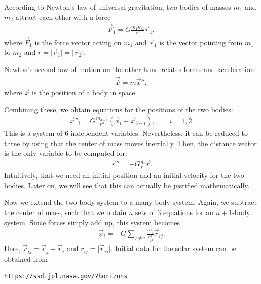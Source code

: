 \begin{example}
  According to Newton's law of universal gravitation, two bodies of
  masses $m_1$ and $m_2$ attract each other with a force
  \begin{gather*}
    \vec F_1 = G \frac{m_1m_2}{r^3} \vec r_1,
  \end{gather*}
  where $\vec F_1$ is the force vector acting on $m_1$ and $\vec r_1$
  is the vector pointing from $m_1$ to $m_2$ and $r = \lvert\vec r_1\rvert = \lvert\vec r_2\rvert$.

  Newton's second law of motion on the other hand relates forces and
  acceleration:
  \begin{gather*}
    \vec F = m \vec x'',
  \end{gather*}
  where $\vec x$ is the position of a body in space.

  Combining these, we obtain equations for the positions of the two bodies:
  \begin{gather*}
    \vec x''_i = G \frac{m_{3-i}}{r^3} (\vec x_i - \vec x_{3-i}), \qquad i=1,2.
  \end{gather*}
  This is a system of 6 independent variables. Nevertheless, it can be
  reduced to three by using that the center of mass moves
  inertially. Then, the distance vector is the only variable to be
  computed for:
  \begin{gather*}
    \vec r'' = - G \frac{m}{r^3} \vec r.
  \end{gather*}
  Intuitively, that we need an initial position and an initial
  velocity for the two bodies. Later on, we will see that this can
  actually be justified mathematically.
\end{example}

\begin{example}
  Now we extend the two-body system to a many-body system. Again, we
  subtract the center of mass, such that we obtain $n$ sets of 3
  equations for an $n+1$-body system. Since forces simply add up, this
  system becomes
  \begin{gather}
    \label{eq:celestial}
    \vec x_i = -G \sum_{j\neq i} \frac{m_j}{r_{ij}^3} \vec r_{ij}.
  \end{gather}
  Here, $\vec r_{ij} = \vec r_j - \vec r_i$ and $r_{ij} = \lvert \vec r_{ij}\rvert$.
  Initial data for the solar system can be obtained from
  \begin{center}
    \texttt{https://ssd.jpl.nasa.gov/?horizons}
  \end{center}
\end{example}

